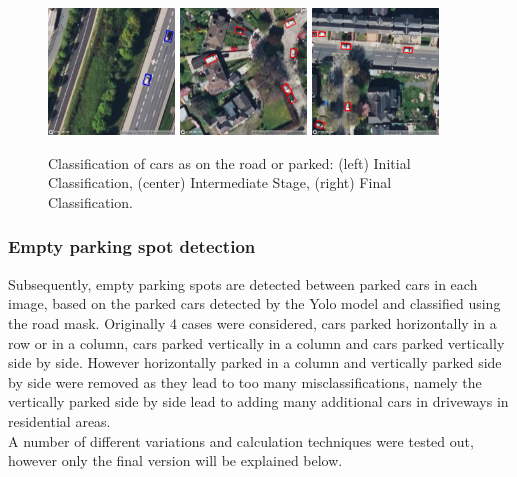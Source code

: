 \begin{figure}[htbp]
  \centering
  \includegraphics[width=0.30\textwidth]{images/road_mask_classification1.png}
  \hfill
  \includegraphics[width=0.30\textwidth]{images/road_mask_classification2.png}
  \hfill
  \includegraphics[width=0.30\textwidth]{images/road_mask_classification3.png}
  \caption{Classification of cars as on the road or parked: (left) Initial Classification, (center) Intermediate Stage, (right) Final Classification.}
  \label{fig:road_mask_classification}
\end{figure}


\newpage

\subsubsection{Empty parking spot detection}
Subsequently, empty parking spots are detected between parked cars in each image, based on the parked cars detected by the Yolo model and classified using the road mask.
Originally 4 cases were considered, cars parked horizontally in a row or in a column, cars parked vertically in a column and cars parked vertically side by side. However horizontally parked in a column and vertically parked side by side were removed as they lead to too many misclassifications, namely the vertically parked side by side lead to adding many additional cars in driveways in residential areas.\\
A number of different variations and calculation techniques were tested out, however only the final version will be explained below.

